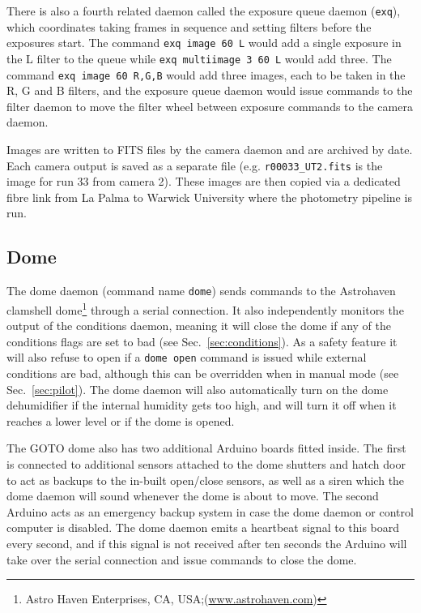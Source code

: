 \begin{colsection}
\begin{colsection}
There is also a fourth related daemon called the exposure queue daemon (\texttt{exq}), which coordinates taking frames in sequence and setting filters before the exposures start. The command \texttt{exq~image~60~L} would add a single exposure in the L filter to the queue while \texttt{exq~multiimage~3~60~L} would add three. The command \texttt{exq~image~60~R,G,B} would add three images, each to be taken in the R, G and B filters, and the exposure queue daemon would issue commands to the filter daemon to move the filter wheel between exposure commands to the camera daemon.

Images are written to FITS files by the camera daemon and are archived by date. Each camera output is saved as a separate file (e.g. \texttt{r00033\_UT2.fits} is the image for run 33 from camera 2). These images are then copied via a dedicated fibre link from La Palma to Warwick University where the photometry pipeline is run.

\end{colsection}


\subsection{Dome}
\label{sec:dome}
\begin{colsection}

The dome daemon (command name \texttt{dome}) sends commands to the Astrohaven clamshell dome\footnote{Astro Haven Enterprises, CA, USA;\@ (\url{www.astrohaven.com})} through a serial connection. It also independently monitors the output of the conditions daemon, meaning it will close the dome if any of the conditions flags are set to bad (see Sec.~\ref{sec:conditions}). As a safety feature it will also refuse to open if a \texttt{dome open} command is issued while external conditions are bad, although this can be overridden when in manual mode (see Sec.~\ref{sec:pilot}). The dome daemon will also automatically turn on the dome dehumidifier if the internal humidity gets too high, and will turn it off when it reaches a lower level or if the dome is opened.

The GOTO dome also has two additional Arduino boards fitted inside. The first is connected to additional sensors attached to the dome shutters and hatch door to act as backups to the in-built open/close sensors, as well as a siren which the dome daemon will sound whenever the dome is about to move. The second Arduino acts as an emergency backup system in case the dome daemon or control computer is disabled. The dome daemon emits a heartbeat signal to this board every second, and if this signal is not received after ten seconds the Arduino will take over the serial connection and issue commands to close the dome.


\end{colsection}
\end{colsection}
